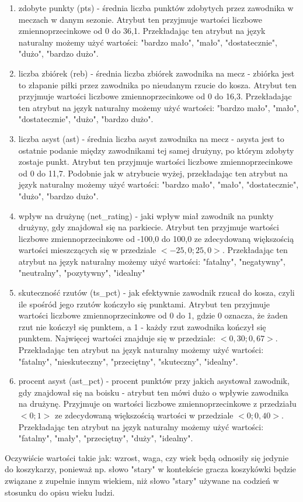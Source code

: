 \documentclass{classrep}
\begin{document}
\begin{itemize}
\begin{enumerate}
        \item zdobyte punkty (pts) - średnia liczba punktów zdobytych przez zawodnika w meczach w danym sezonie. Atrybut ten przyjmuje wartości liczbowe zmiennoprzecinkowe od 0 do 36,1. Przekładając ten atrybut na język naturalny możemy użyć wartości: "bardzo mało", "mało", "dostatecznie", "dużo", "bardzo dużo".
        \item liczba zbiórek (reb) - średnia liczba zbiórek zawodnika na mecz - zbiórka jest to złapanie piłki przez zawodnika po nieudanym rzucie do kosza. Atrybut ten przyjmuje wartości liczbowe zmiennoprzecinkowe od 0 do 16,3. Przekładając ten atrybut na język naturalny możemy użyć wartości: "bardzo mało", "mało", "dostatecznie", "dużo", "bardzo dużo".
        \item liczba asyst (ast) - średnia liczba asyst zawodnika na mecz - asysta jest to ostatnie podanie między zawodnikami tej samej drużyny, po którym zdobyty zostaje punkt. Atrybut ten przyjmuje wartości liczbowe zmiennoprzecinkowe od 0 do 11,7. Podobnie jak w atrybucie wyżej, przekładając ten atrybut na język naturalny możemy użyć wartości: "bardzo mało", "mało", "dostatecznie", "dużo", "bardzo dużo".
        \item wpływ na drużynę (net\_rating) - jaki wpływ miał zawodnik na punkty drużyny, gdy znajdował się na parkiecie. Atrybut ten przyjmuje wartości liczbowe zmiennoprzecinkowe od -100,0 do 100,0 ze zdecydowaną większością wartości mieszczących się w przedziale $<-25,0; 25,0>$. Przekładając ten atrybut na język naturalny możemy użyć wartości:
        "fatalny", "negatywny", "neutralny", "pozytywny", "idealny"
        \item skuteczność rzutów (ts\_pct) - jak efektywnie zawodnik rzucał do kosza, czyli ile spośród jego rzutów kończyło się punktami. Atrybut ten przyjmuje wartości liczbowe zmiennoprzecinkowe od 0 do 1, gdzie 0 oznacza, że żaden rzut nie kończył się punktem, a 1 - każdy rzut zawodnika kończył się punktem. Najwięcej wartości znajduje się w przedziale: $<0,30; 0,67>$.  Przekładając ten atrybut na język naturalny możemy użyć wartości: "fatalny", "nieskuteczny", "przeciętny", "skuteczny", "idealny".
        \item procent asyst (ast\_pct) - procent punktów przy jakich asystował zawodnik, gdy znajdował się na boisku - atrybut ten mówi dużo o wpływie zawodnika na drużynę. Przyjmuje on wartości liczbowe zmiennoprzecinkowe z przedziału $<0;1>$ ze zdecydowaną większością wartości w przedziale $<0; 0,40>$. Przekładając ten atrybut na język naturalny możemy użyć wartości: "fatalny", "mały", "przeciętny", "duży", "idealny".
    \end{enumerate}
\end{itemize}
Oczywiście wartości takie jak: wzrost, waga, czy wiek będą odnosiły się jedynie do koszykarzy, ponieważ np. słowo "stary" w kontekście gracza koszykówki będzie związane z zupełnie innym wiekiem, niż słowo "stary" używane na codzień w stosunku do opisu wieku ludzi. \\
\end{document}
